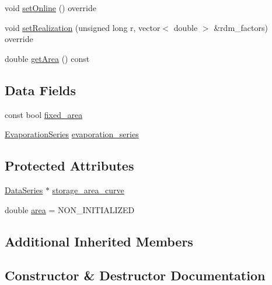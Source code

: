 \begin{DoxyCompactItemize}
\item 
void \mbox{\hyperlink{classReservoir_ac6f64dd92c401e58095e7b125855041b_ac6f64dd92c401e58095e7b125855041b}{set\+Online}} () override
\item 
void \mbox{\hyperlink{classReservoir_ad1bb7aa46397719d09e0b6188b9bc28d_ad1bb7aa46397719d09e0b6188b9bc28d}{set\+Realization}} (unsigned long r, vector$<$ double $>$ \&rdm\+\_\+factors) override
\item 
double \mbox{\hyperlink{classReservoir_af86ffdaa2842a38b7f59e0360a1004a1_af86ffdaa2842a38b7f59e0360a1004a1}{get\+Area}} () const
\end{DoxyCompactItemize}
\subsection*{Data Fields}
\begin{DoxyCompactItemize}
\item 
const bool \mbox{\hyperlink{classReservoir_ad4b37aef4873071d1766baaccce5b8cf_ad4b37aef4873071d1766baaccce5b8cf}{fixed\+\_\+area}}
\item 
\mbox{\hyperlink{classEvaporationSeries}{Evaporation\+Series}} \mbox{\hyperlink{classReservoir_a2d2d9b302c13703309bb798d24136810_a2d2d9b302c13703309bb798d24136810}{evaporation\+\_\+series}}
\end{DoxyCompactItemize}
\subsection*{Protected Attributes}
\begin{DoxyCompactItemize}
\item 
\mbox{\hyperlink{classDataSeries}{Data\+Series}} $\ast$ \mbox{\hyperlink{classReservoir_a46bd5b750963dfa9a57b247fd77ab8ff_a46bd5b750963dfa9a57b247fd77ab8ff}{storage\+\_\+area\+\_\+curve}}
\item 
double \mbox{\hyperlink{classReservoir_a57ab55e0dde9e29a4ff97de98b09e458_a57ab55e0dde9e29a4ff97de98b09e458}{area}} = N\+O\+N\+\_\+\+I\+N\+I\+T\+I\+A\+L\+I\+Z\+ED
\end{DoxyCompactItemize}
\subsection*{Additional Inherited Members}


\subsection{Constructor \& Destructor Documentation}
\mbox{\label{classReservoir_ac9803ae5446e4e9a2631ce66817004cf_ac9803ae5446e4e9a2631ce66817004cf}} 
